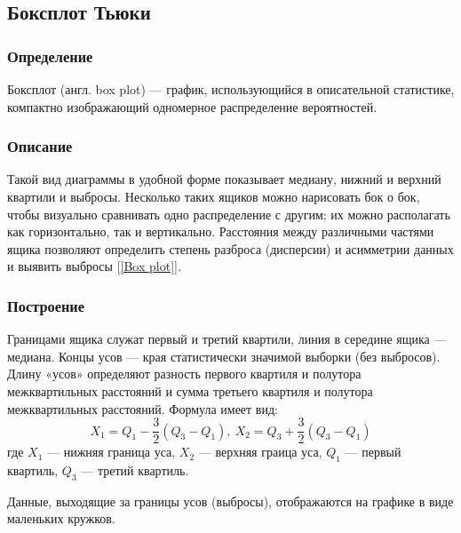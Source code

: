 \documentclass[12pt,a4paper]{article}
\begin{document}
	\subsection{Боксплот Тьюки}
	\subsubsection{Определение}
		Боксплот (англ. box plot) — график, использующийся в описательной статистике, компактно изображающий одномерное распределение вероятностей.
		
	\subsubsection{Описание}
		Такой вид диаграммы в удобной форме показывает медиану, нижний и верхний квартили и выбросы. Несколько таких ящиков можно нарисовать бок о бок, чтобы визуально сравнивать одно распределение с другим; их можно располагать как горизонтально, так и вертикально. Расстояния между различными частями ящика позволяют определить степень разброса (дисперсии) и асимметрии данных и выявить выбросы [\ref{Box plot}].
		
	\subsubsection{Построение}
		Границами ящика служат первый и третий квартили, линия в середине
		ящика — медиана. Концы усов — края статистически значимой выборки
		(без выбросов). Длину «усов» определяют разность первого квартиля и полутора межквартильных расстояний и сумма третьего квартиля и полутора
		межквартильных расстояний. Формула имеет вид:
		\begin{equation}\label{eqn:box_plot}
		X_1 = Q_1 - \frac{3}{2}(Q_3 - Q_1),\  X_2 = Q_3 + \frac{3}{2}(Q_3 - Q_1)
		\end{equation}
		где $X_1$ --- нижняя граница уса, $X_2$ --- верхняя граица уса, $Q_1$ --- первый квартиль, $Q_3$ --- третий квартиль.
		
		Данные, выходящие за границы усов (выбросы), отображаются на графике
		в виде маленьких кружков.
		
		
		
\end{document}
